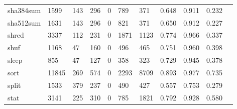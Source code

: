 \begin{longtable}{lp{1.10cm}p{1.10cm}p{1.10cm}p{1.10cm}p{1.10cm}p{1.10cm}p{1.10cm}p{1.10cm}p{1.10cm}p{1.10cm}}
sha384sum &                   1599 &                                143 &                               296 &                                0 &                               789 &                             371 &                             0.648 &                                 0.911 &                               0.232 \\
sha512sum &                   1631 &                                143 &                               296 &                                0 &                               821 &                             371 &                             0.650 &                                 0.912 &                               0.227 \\
shred     &                   3337 &                                112 &                               231 &                                0 &                              1871 &                            1123 &                             0.774 &                                 0.966 &                               0.337 \\
shuf      &                   1168 &                                 47 &                               160 &                                0 &                               496 &                             465 &                             0.751 &                                 0.960 &                               0.398 \\
sleep     &                    855 &                                 47 &                               127 &                                0 &                               358 &                             323 &                             0.729 &                                 0.945 &                               0.378 \\
sort      &                  11845 &                                269 &                               574 &                                0 &                              2293 &                            8709 &                             0.893 &                                 0.977 &                               0.735 \\
split     &                   1533 &                                379 &                               237 &                                0 &                               490 &                             427 &                             0.557 &                                 0.753 &                               0.279 \\
stat      &                   3141 &                                225 &                               310 &                                0 &                               785 &                            1821 &                             0.792 &                                 0.928 &                               0.580 \\

\end{longtable}

